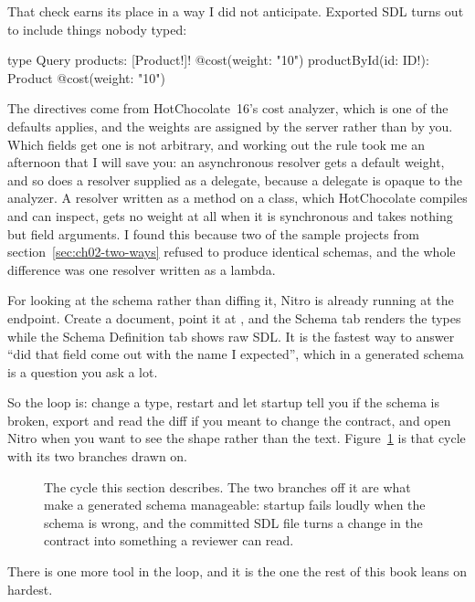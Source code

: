 That check earns its place in a way I did not anticipate. Exported SDL turns out
to include things nobody typed:

\begin{graphqlsdl}
type Query {
  products: [Product!]! @cost(weight: "10")
  productById(id: ID!): Product @cost(weight: "10")
}
\end{graphqlsdl}

%
The  directives come from HotChocolate~16's cost analyzer, which is
one of the defaults  applies, and the weights are
assigned by the server rather than by you. Which fields get one is not arbitrary,
and working out the rule took me an afternoon that I will save you: an
asynchronous resolver gets a default weight, and so does a resolver supplied as
a delegate, because a delegate is opaque to the analyzer. A resolver written as
a method on a class, which HotChocolate compiles and can inspect, gets no weight
at all when it is synchronous and takes nothing but field arguments. I found
this because two of the sample projects from
section~\ref{sec:ch02-two-ways} refused to produce identical schemas, and the
whole difference was one resolver written as a lambda.

%
For looking at the schema rather than diffing it, Nitro is already running at
the endpoint. Create a document, point it at
, and the Schema tab renders the types while
the Schema Definition tab shows raw SDL. It is the fastest way to answer
\enquote{did that field come out with the name I expected}, which in a
generated schema is a question you ask a lot.

So the loop is: change a type, restart and let startup tell you if the schema is
broken, export and read the diff if you meant to change the contract, and open
Nitro when you want to see the shape rather than the text.
Figure~\ref{fig:ch02-dev-loop} is that cycle with its two branches drawn on.

\begin{figure}[htbp]
  \centering
  
  \caption{The cycle this section describes. The two branches off it are what
  make a generated schema manageable: startup fails loudly when the schema is
  wrong, and the committed SDL file turns a change in the contract into
  something a reviewer can read.}
  \label{fig:ch02-dev-loop}
\end{figure}

There is one more tool in the loop, and it is the one the rest of this book
leans on hardest.
